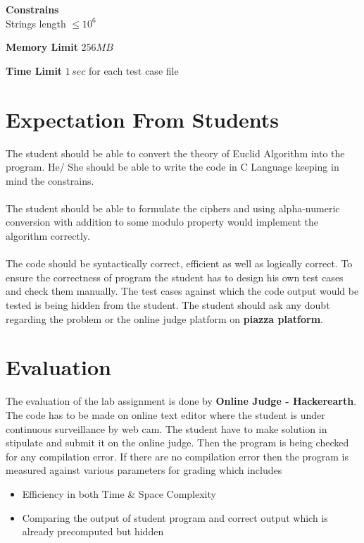 \documentclass{article}
\begin{document}
			\textbf{Constrains} \\
			
				Strings length $\leq 10^6$


		
			\textbf{Memory Limit}
				$256 MB$
	
		 	\textbf{Time Limit}
				$1 \, sec$ for each test case file

\section{Expectation From Students}
		The student should be able to convert the theory of Euclid Algorithm into the program. He/ She should be able to write the code in C Language keeping in mind the constrains.\\ \\

		The student should be able to formulate the ciphers and using alpha-numeric conversion with addition to some modulo property would implement the algorithm correctly. \\ \\
 The code should be syntactically correct, efficient as well as logically correct. To ensure the correctness of program the student has to design his own test cases and check them manually. The test cases against which the code output would be tested is being hidden from the student. The student should ask any doubt regarding the problem or the online judge platform on \textbf{piazza platform}.
	\section{Evaluation}
		The evaluation of the lab assignment is done by \textbf{Online Judge - Hackerearth}. The code has to be made on online text editor where the student is under continuous surveillance by web cam. The student have to make solution in stipulate and submit it on the online judge. Then the program is being checked for any compilation error. If there are no compilation error then the program is measured against various parameters for grading which includes \\
\begin{itemize}
	\item Efficiency in both Time \& Space Complexity
	\item Comparing the output of student program and correct output which is already precomputed but hidden
\end{itemize}
\end{document}
